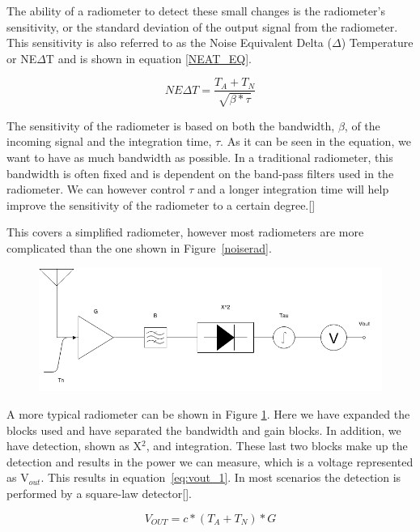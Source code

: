 The ability of a radiometer to detect these small changes is the radiometer's sensitivity, or the standard deviation of the output signal from the radiometer.  This sensitivity is also referred to as the Noise Equivalent Delta ($\Delta$) Temperature or NE$\Delta$T and is shown in equation \ref{NEAT_EQ}. 

\begin{equation} \label{NEAT_EQ}
NE\Delta T=\frac{T_{A}+T_{N}}{\sqrt{\beta * \tau}}
\end{equation}

The sensitivity of the radiometer is based on both the bandwidth, $\beta$, of the incoming signal and the integration time, $\tau$.  As it can be seen in the equation, we want to have as much bandwidth as possible.  In a traditional radiometer, this bandwidth is often fixed and is dependent on the band-pass filters used in the radiometer.  We can however control $\tau$ and a longer integration time will help improve the sensitivity of the radiometer to a certain degree.[\cite{ulaby}]

This covers a simplified radiometer, however most radiometers are more complicated than the one shown in Figure~\ref{noiserad}.

{\begin{figure}[h!tb] 
\centering
\includegraphics[width=\textwidth]{Images/Radiometer.png}
\label{trad_radiometer}
\end{figure}
}

A more typical radiometer can be shown in Figure \ref{trad_radiometer}.  Here we have expanded the blocks used and have separated the bandwidth and gain blocks.  In addition, we have detection, shown as X$^2$, and integration.  These last two blocks make up the detection and results in the power we can measure, which is a voltage represented as V$_{out}$.  This results in equation~\ref{eq:vout_1}.  In most scenarios the detection is performed by a square-law detector[\cite{Leinweber}].

\begin{equation} \label{eq:vout_1}
V_{OUT}=c*(T_A+T_N)*G
\end{equation}

